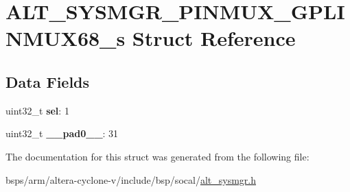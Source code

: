\hypertarget{structALT__SYSMGR__PINMUX__GPLINMUX68__s}{}\section{A\+L\+T\+\_\+\+S\+Y\+S\+M\+G\+R\+\_\+\+P\+I\+N\+M\+U\+X\+\_\+\+G\+P\+L\+I\+N\+M\+U\+X68\+\_\+s Struct Reference}
\label{structALT__SYSMGR__PINMUX__GPLINMUX68__s}
\subsection*{Data Fields}
\begin{DoxyCompactItemize}
\item 
\mbox{\label{structALT__SYSMGR__PINMUX__GPLINMUX68__s_ac1da7be9061880febab4528bd70c5ce3}} 
uint32\+\_\+t {\bfseries sel}\+: 1
\item 
\mbox{\label{structALT__SYSMGR__PINMUX__GPLINMUX68__s_ad9cc5951c55ba7009c4cbf26053c5c7b}} 
uint32\+\_\+t {\bfseries \+\_\+\+\_\+pad0\+\_\+\+\_\+}\+: 31
\end{DoxyCompactItemize}


The documentation for this struct was generated from the following file\+:\begin{DoxyCompactItemize}
\item 
bsps/arm/altera-\/cyclone-\/v/include/bsp/socal/\mbox{\hyperlink{alt__sysmgr_8h}{alt\+\_\+sysmgr.\+h}}\end{DoxyCompactItemize}
